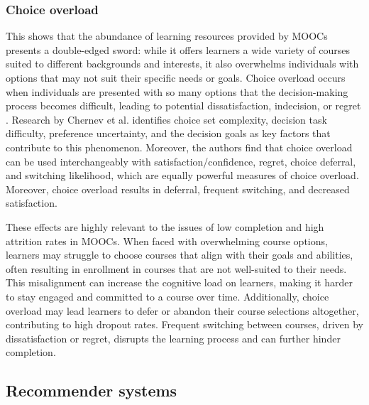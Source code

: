 \subsubsection{Choice overload}

This shows that the abundance of learning resources provided by MOOCs presents a double-edged sword: while it offers learners a wide variety of courses suited to different backgrounds and interests, it also overwhelms individuals with options that may not suit their specific needs or goals. Choice overload occurs when individuals are presented with so many options that the decision-making process becomes difficult, leading to potential dissatisfaction, indecision, or regret  \cite{chernev_choice_2015}. Research by Chernev et al. identifies choice set complexity, decision task difficulty, preference uncertainty, and the decision goals as key factors that contribute to this phenomenon. Moreover, the authors find that choice overload can be used interchangeably with satisfaction/confidence, regret, choice deferral, and switching likelihood, which are equally powerful measures of choice overload. Moreover, choice overload results in deferral, frequent switching, and decreased satisfaction. 

These effects are highly relevant to the issues of low completion and high attrition rates in MOOCs. When faced with overwhelming course options, learners may struggle to choose courses that align with their goals and abilities, often resulting in enrollment in courses that are not well-suited to their needs. This misalignment can increase the cognitive load on learners, making it harder to stay engaged and committed to a course over time. Additionally, choice overload may lead learners to defer or abandon their course selections altogether, contributing to high dropout rates. Frequent switching between courses, driven by dissatisfaction or regret, disrupts the learning process and can further hinder completion.

\subsection{Recommender systems} 

